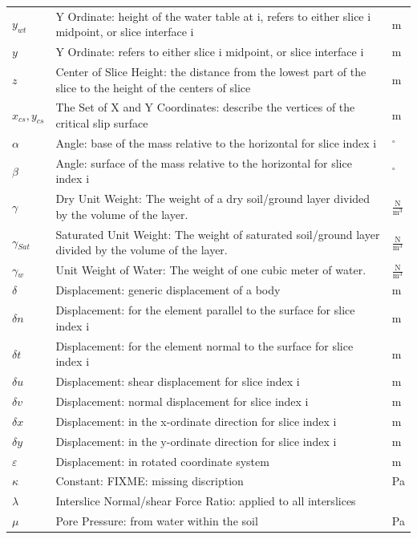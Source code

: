 \documentclass[12pt]{article}
\begin{document}
\begin{longtable*}{l l l}
$y_{wt}$ & Y Ordinate: height of the water table at i, refers to either slice i midpoint, or slice interface i & m
\\
$y$ & Y Ordinate: refers to either slice i midpoint, or slice interface i & m
\\
$z$ & Center of Slice Height: the distance from the lowest part of the slice to the height of the centers of slice & m
\\
${x_{cs},y_{cs}}$ & The Set of X and Y Coordinates: describe the vertices of the critical slip surface & m
\\
$\alpha{}$ & Angle: base of the mass relative to the horizontal for slice index i & ${}^{\circ}$
\\
$\beta{}$ & Angle: surface of the mass relative to the horizontal for slice index i & ${}^{\circ}$
\\
$\gamma{}$ & Dry Unit Weight: The weight of a dry soil/ground layer divided by the volume of the layer. & $\frac{\text{N}}{\text{m}^{3}}$
\\
$\gamma{}_{Sat}$ & Saturated Unit Weight: The weight of saturated soil/ground layer divided by the volume of the layer. & $\frac{\text{N}}{\text{m}^{3}}$
\\
$\gamma{}_{w}$ & Unit Weight of Water: The weight of one cubic meter of water. & $\frac{\text{N}}{\text{m}^{3}}$
\\
$\delta{}$ & Displacement: generic displacement of a body & m
\\
$\delta{}n$ & Displacement: for the element parallel to the surface for slice index i & m
\\
$\delta{}t$ & Displacement: for the element normal to the surface for slice index i & m
\\
$\delta{}u$ & Displacement: shear displacement for slice index i & m
\\
$\delta{}v$ & Displacement: normal displacement for slice index i & m
\\
$\delta{}x$ & Displacement: in the x-ordinate direction for slice index i & m
\\
$\delta{}y$ & Displacement: in the y-ordinate direction for slice index i & m
\\
$\varepsilon{}$ & Displacement: in rotated coordinate system & m
\\
$\kappa{}$ & Constant: FIXME: missing discription & Pa
\\
$\lambda{}$ & Interslice Normal/shear Force Ratio: applied to all interslices & 
\\
$\mu{}$ & Pore Pressure: from water within the soil & Pa

\end{longtable*}
\end{document}
